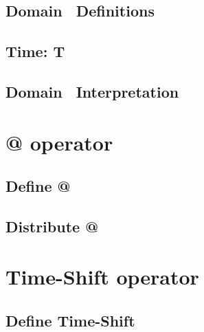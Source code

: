 \documentclass[fleqn,openany]{book}
\newcommand{\logicid}{Domain}
\begin{document}
\subsection{\logicid~ Definitions}
\allowdisplaybreaks{

}  %

\subsection{Time: $\mathbf{T}$}
\allowdisplaybreaks{

}  %

\subsection{\logicid~ Interpretation}\label{subsec:interpretation}
\allowdisplaybreaks{

}  %

\allowdisplaybreaks{

}  %

\section{ @ operator}
\subsection{Define @}
\allowdisplaybreaks{

}  %

\subsection{Distribute @}
\allowdisplaybreaks{

}  %

\section{ Time-Shift operator}
\subsection{Define Time-Shift}
\allowdisplaybreaks{

}  %
\end{document}
